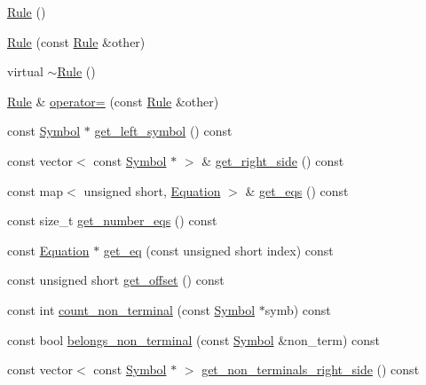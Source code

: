 \begin{CompactItemize}
\item 
\hyperlink{classgenevalmag_1_1Rule_1c442e245962ae690729738c7b520c1e}{Rule} ()
\item 
\hyperlink{classgenevalmag_1_1Rule_fcf6ef1d44e45aef162eff2e42f6d68e}{Rule} (const \hyperlink{classgenevalmag_1_1Rule}{Rule} \&other)
\item 
virtual \hyperlink{classgenevalmag_1_1Rule_70a5808ffd4cbce7f8cb3daf4ed1aa71}{$\sim$Rule} ()
\item 
\hyperlink{classgenevalmag_1_1Rule}{Rule} \& \hyperlink{classgenevalmag_1_1Rule_e274bef9bade4c17cefc5fbf0cfef8ec}{operator=} (const \hyperlink{classgenevalmag_1_1Rule}{Rule} \&other)
\item 
const \hyperlink{classgenevalmag_1_1Symbol}{Symbol} $\ast$ \hyperlink{classgenevalmag_1_1Rule_4d67205ef292350a440a10f7bbdda0e1}{get\_\-left\_\-symbol} () const 
\item 
const vector$<$ const \hyperlink{classgenevalmag_1_1Symbol}{Symbol} $\ast$ $>$ \& \hyperlink{classgenevalmag_1_1Rule_2dcb9b7560f962cb6ece6364e209003b}{get\_\-right\_\-side} () const 
\item 
const map$<$ unsigned short, \hyperlink{classgenevalmag_1_1Equation}{Equation} $>$ \& \hyperlink{classgenevalmag_1_1Rule_a91f94ae6289b840dc17414c59a844a4}{get\_\-eqs} () const 
\item 
const size\_\-t \hyperlink{classgenevalmag_1_1Rule_702d3fa2d88408087e57b2fd58706ca7}{get\_\-number\_\-eqs} () const 
\item 
const \hyperlink{classgenevalmag_1_1Equation}{Equation} $\ast$ \hyperlink{classgenevalmag_1_1Rule_f7912b2d239ede0e33ed6cb12b2d79ee}{get\_\-eq} (const unsigned short index) const 
\item 
const unsigned short \hyperlink{classgenevalmag_1_1Rule_e0c8764f699b6c41f46a9a0c6e010e6c}{get\_\-offset} () const 
\item 
const int \hyperlink{classgenevalmag_1_1Rule_39eaafed8e0b506686d83175329c1085}{count\_\-non\_\-terminal} (const \hyperlink{classgenevalmag_1_1Symbol}{Symbol} $\ast$symb) const 
\item 
const bool \hyperlink{classgenevalmag_1_1Rule_587e49507f553c99c79c82aabe6c470f}{belongs\_\-non\_\-terminal} (const \hyperlink{classgenevalmag_1_1Symbol}{Symbol} \&non\_\-term) const 
\item 
const vector$<$ const \hyperlink{classgenevalmag_1_1Symbol}{Symbol} $\ast$ $>$ \hyperlink{classgenevalmag_1_1Rule_639ed428a76f9c389bad3fc7730aaef6}{get\_\-non\_\-terminals\_\-right\_\-side} () const 

\end{CompactItemize}
